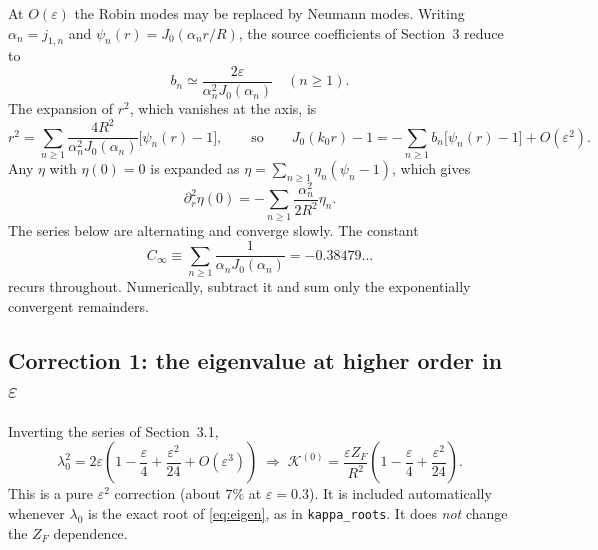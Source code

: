 \documentclass[11pt]{article}
\numberwithin{equation}{section}
\begin{document}
At $O(\varepsilon)$ the Robin modes may be replaced by Neumann modes. Writing $\alpha_n=j_{1,n}$ and $\psi_n(r)=J_0(\alpha_nr/R)$, the source coefficients of Section~3 reduce to
\begin{equation}b_n\simeq\frac{2\varepsilon}{\alpha_n^2J_0(\alpha_n)}\quad(n\ge1).\label{eq:bn_lead}\end{equation}
The expansion of $r^2$, which vanishes at the axis, is
\begin{equation}r^2=\sum_{n\ge1}\frac{4R^2}{\alpha_n^2J_0(\alpha_n)}\bigl[\psi_n(r)-1\bigr],\qquad\text{so}\qquad J_0(k_0r)-1=-\sum_{n\ge1}b_n\bigl[\psi_n(r)-1\bigr]+O(\varepsilon^2).\label{eq:r2}\end{equation}
Any $\eta$ with $\eta(0)=0$ is expanded as $\eta=\sum_{n\ge1}\eta_n(\psi_n-1)$, which gives
\begin{equation}\partial_r^2\eta(0)=-\sum_{n\ge1}\frac{\alpha_n^2}{2R^2}\eta_n.\end{equation}
The series below are alternating and converge slowly. The constant
\begin{equation}C_\infty\equiv\sum_{n\ge1}\frac{1}{\alpha_nJ_0(\alpha_n)}=-0.38479\ldots\label{eq:Cinf}\end{equation}
recurs throughout. Numerically, subtract it and sum only the exponentially convergent remainders.

\subsection{\texorpdfstring{Correction 1: the eigenvalue at higher order in $\varepsilon$}{Correction 1: the eigenvalue at higher order in epsilon}}
Inverting the series of Section~3.1,
\begin{equation}\lambda_0^2=2\varepsilon\left(1-\frac{\varepsilon}{4}+\frac{\varepsilon^2}{24}+O(\varepsilon^3)\right)\;\Rightarrow\;
\mathcal K^{(0)}=\frac{\varepsilon Z_F}{R^2}\left(1-\frac{\varepsilon}{4}+\frac{\varepsilon^2}{24}\right).\end{equation}
This is a pure $\varepsilon^2$ correction (about $7\%$ at $\varepsilon=0.3$). It is included automatically whenever $\lambda_0$ is the exact root of \eqref{eq:eigen}, as in \texttt{kappa\_roots}. It does \emph{not} change the $Z_F$ dependence.
\end{document}
